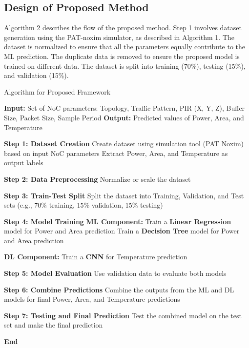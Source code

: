 \documentclass[conference]{IEEEtran}
\begin{document}
\subsection{Design of Proposed Method}
Algorithm 2 describes the flow of the proposed method. Step 1 involves dataset generation using the PAT-noxim simulator, as described in Algorithm 1. The dataset is normalized to ensure that all the parameters equally contribute to the ML prediction. The duplicate data is removed to ensure the proposed model is trained on different data. The dataset is split into training (70\%), testing (15\%), and validation (15\%).


\begin{algorithm}
\caption{Algorithm for Proposed Framework}\label{alg:pat_prediction}
\begin{algorithmic}[1]
    \State \textbf{Input:} Set of NoC parameters: Topology, Traffic Pattern, PIR (X, Y, Z), Buffer Size, Packet Size, Sample Period
    \State \textbf{Output:} Predicted values of Power, Area, and Temperature
    
    \State \textbf{Step 1: Dataset Creation}
    \State Create dataset using simulation tool (PAT Noxim) based on input NoC parameters
    \State Extract Power, Area, and Temperature as output labels
    
    \State \textbf{Step 2: Data Preprocessing}
    \State Normalize or scale the dataset
    
    \State \textbf{Step 3: Train-Test Split}
    \State Split the dataset into Training, Validation, and Test sets (e.g., 70\% training, 15\% validation, 15\% testing)
    
    \State \textbf{Step 4: Model Training}
    \State \textbf{ML Component:}
    \State Train a \textbf{Linear Regression} model for Power and Area prediction
    \State Train a \textbf{Decision Tree} model for Power and Area prediction
    
    \State \textbf{DL Component:}
    \State Train a \textbf{CNN} for Temperature prediction
    
    \State \textbf{Step 5: Model Evaluation}
    \State Use validation data to evaluate both models
    
    \State \textbf{Step 6: Combine Predictions}
    \State Combine the outputs from the ML and DL models for final Power, Area, and Temperature predictions
    
    \State \textbf{Step 7: Testing and Final Prediction}
    \State Test the combined model on the test set and make the final prediction
    
    \State \textbf{End}
\end{algorithmic}
\end{algorithm}
\end{document}
